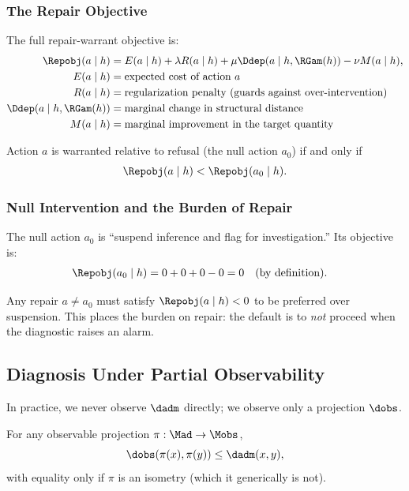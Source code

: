 \subsubsection{The Repair Objective}

The full repair-warrant objective is:
\begin{align}
\Repobj(a \mid h) &= E(a \mid h) + \lambda R(a \mid h) + \mu \Ddep(a \mid h, \RGam(h)) - \nu M(a \mid h), \label{eq:repair-objective} \\
E(a \mid h) &= \text{expected cost of action } a \\
R(a \mid h) &= \text{regularization penalty (guards against over-intervention)} \\
\Ddep(a \mid h, \RGam(h)) &= \text{marginal change in structural distance} \\
M(a \mid h) &= \text{marginal improvement in the target quantity}
\end{align}

\begin{theorem}
Action $a$ is warranted relative to refusal (the null action $a_0$) if and only if
\[
\Repobj(a \mid h) < \Repobj(a_0 \mid h).
\]
\end{theorem}

\subsubsection{Null Intervention and the Burden of Repair}

The null action $a_0$ is ``suspend inference and flag for investigation.'' Its objective is:
\begin{align*}
\Repobj(a_0 \mid h) &= 0 + 0 + 0 - 0 = 0 \quad \text{(by definition)}.
\end{align*}

Any repair $a \neq a_0$ must satisfy $\Repobj(a \mid h) < 0$ to be preferred over suspension. This places the burden on repair: the default is to \emph{not} proceed when the diagnostic raises an alarm.


\subsection{Diagnosis Under Partial Observability}

In practice, we never observe $\dadm$ directly; we observe only a projection $\dobs$.

\begin{proposition}
For any observable projection $\pi: \Mad \to \Mobs$,
\[
\dobs(\pi(x), \pi(y)) \leq \dadm(x, y),
\]
with equality only if $\pi$ is an isometry (which it generically is not).
\end{proposition}

